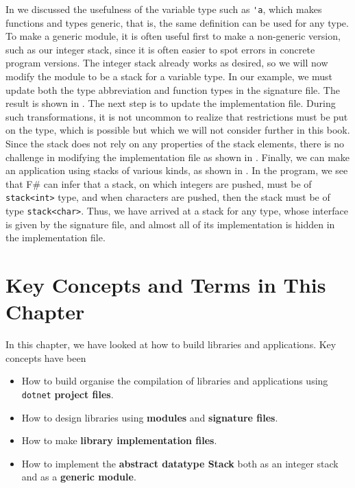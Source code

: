 \documentclass[fsharpNotes.tex]{subfiles}
\begin{document}
In  we discussed the usefulness of the variable type such as \lstinline{'a}, which makes functions and types generic, that is, the same definition can be used for any type. To make a generic module, it is often useful first to make a non-generic version, such as our integer stack, since it is often easier to spot errors in concrete program versions. The integer stack already works as desired, so we will now modify the module to be a stack for a variable type. In our example, we must update both the type abbreviation and function types in the signature file. The result is shown in .
The next step is to update the implementation file. During such transformations, it is not uncommon to realize that restrictions must be put on the type, which is possible but which we will not consider further in this book. Since the stack does not rely on any properties of the stack elements, there is no challenge in modifying the implementation file as shown in .
Finally, we can make an application using stacks of various kinds, as shown in .
In the program, we see that F\# can infer that a stack, on which integers are pushed, must be of \lstinline{stack<int>} type, and when characters are pushed, then the stack must be of type \lstinline{stack<char>}. Thus, we have arrived at a stack for any type, whose interface is given by the signature file, and almost all of its implementation is hidden in the implementation file.

\section{Key Concepts and Terms in This Chapter}
In this chapter, we have looked at how to build libraries and applications. Key concepts have been
\begin{itemize}
\item How to build organise the compilation of libraries and applications using \lstinline[language=console]{dotnet} \textbf{project files}.
\item How to design libraries using \textbf{modules} and \textbf{signature files}.
\item How to make \textbf{library implementation files}.
\item How to implement the \textbf{abstract datatype Stack} both as an integer stack and as a \textbf{generic module}. 
\end{itemize}
\end{document}
